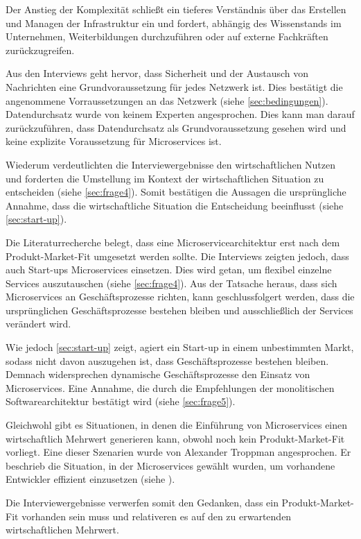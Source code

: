 Der Anstieg der Komplexität schließt ein tieferes Verständnis über das Erstellen und Managen der Infrastruktur ein und fordert, abhängig des Wissenstands im Unternehmen, Weiterbildungen durchzuführen oder auf externe Fachkräften zurückzugreifen.

\label{sec:netzwerk}
Aus den Interviews geht hervor, dass Sicherheit und der Austausch von Nachrichten eine Grundvoraussetzung für jedes Netzwerk ist. Dies bestätigt die angenommene Vorraussetzungen an das Netzwerk (siehe \cref{sec:bedingungen}). Datendurchsatz wurde von keinem Experten angesprochen. Dies kann man darauf zurückzuführen, dass Datendurchsatz als Grundvoraussetzung gesehen wird und keine explizite Voraussetzung für Microservices ist.

Wiederum verdeutlichten die Interviewergebnisse den wirtschaftlichen Nutzen und forderten die Umstellung im Kontext der wirtschaftlichen Situation zu entscheiden (siehe \cref{sec:frage4}). Somit bestätigen die Aussagen die ursprüngliche Annahme, dass die wirtschaftliche Situation die Entscheidung beeinflusst (siehe \cref{sec:start-up}).

Die Literaturrecherche belegt, dass eine Microservicearchitektur erst nach dem Produkt-Market-Fit umgesetzt werden sollte. Die Interviews zeigten jedoch, dass auch Start-ups Microservices einsetzen. Dies wird getan, um flexibel einzelne Services auszutauschen (siehe \cref{sec:frage4}). Aus der Tatsache heraus, dass sich Microservices an Geschäftsprozesse richten, kann geschlussfolgert werden, dass die ursprünglichen Geschäftsprozesse bestehen bleiben und ausschließlich der Services verändert wird.

Wie jedoch \cref{sec:start-up} zeigt, agiert ein Start-up in einem unbestimmten Markt, sodass nicht davon auszugehen ist, dass Geschäftsprozesse bestehen bleiben. Demnach widersprechen dynamische Geschäftsprozesse den Einsatz von Microservices. Eine Annahme, die durch die Empfehlungen der monolitischen Softwarearchitektur bestätigt wird (siehe \cref{sec:frage5}).

Gleichwohl gibt es Situationen, in denen die Einführung von Microservices einen wirtschaftlich Mehrwert generieren kann, obwohl noch kein Produkt-Market-Fit vorliegt. Eine dieser Szenarien wurde von Alexander Troppman angesprochen. Er beschrieb die Situation, in der Microservices gewählt wurden, um vorhandene Entwickler effizient einzusetzen (siehe ).

\label{sec:wirtschaftlich}
Die Interviewergebnisse verwerfen somit den Gedanken, dass ein Produkt-Market-Fit vorhanden sein muss und relativeren es auf den zu erwartenden wirtschaftlichen Mehrwert.

